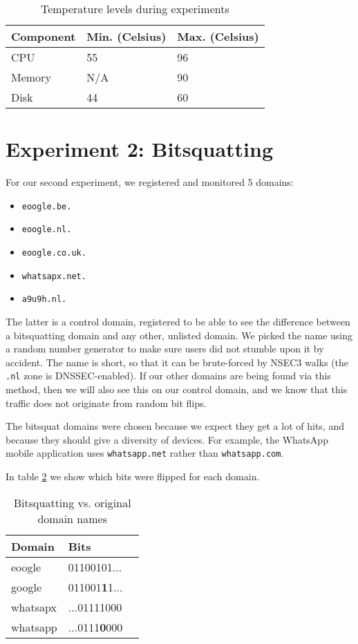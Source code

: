 \documentclass[conference]{IEEEtran}
\begin{document}
\begin{table}[H]
  \centering
  \caption{Temperature levels during experiments}
  \label{table-temp}
  \begin{tabular}{|l|l|l|}
    \hline
    \textbf{Component}   & \textbf{Min. (Celsius)} & \textbf{Max. (Celsius)}\\ \hline
    CPU   & 55 & 96 \\ \hline
    Memory & N/A & 90 \\ \hline
    Disk & 44 & 60 \\ \hline
   \end{tabular}
\end{table}


\section{Experiment 2: Bitsquatting}

For our second experiment, we registered and monitored 5 domains:

\begin{itemize}
  \item \texttt{eoogle.be.}
  \item \texttt{eoogle.nl.}
  \item \texttt{eoogle.co.uk.}
  \item \texttt{whatsapx.net.}
  \item \texttt{a9u9h.nl.}
\end{itemize}

The latter is a control domain, registered to be able to see the difference
between a bitsquatting domain and any other, unlisted domain. We picked the
name using a random number generator to make sure users did not stumble upon it
by accident. The name is short, so that it can be brute-forced by NSEC3 walks
(the \texttt{.nl} zone is DNSSEC-enabled). If our other domains are being found
via this method, then we will also see this on our control domain, and we know
that this traffic does not originate from random bit flips.

The bitsquat domains were chosen because we expect they get a lot of hits, and
because they should give a diversity of devices. For example, the WhatsApp
mobile application uses \texttt{whatsapp.net} rather than
\texttt{whatsapp.com}.

In table \ref{tab:bits} we show which bits were flipped for each domain.

\begin{table}[H]
  \centering
  \caption{Bitsquatting vs. original domain names}
  \label{tab:bits}
  \begin{tabular}{|l|l|l|}
    \hline
    \textbf{Domain}   & \textbf{Bits} \\ \hline
    eoogle   & 01100101... \\ \hline
    google   & 011001\textbf{1}1... \\ \hline
    whatsapx & ...01111000 \\ \hline
    whatsapp & ...0111\textbf{0}000 \\ \hline
   \end{tabular}
\end{table}
\end{document}
